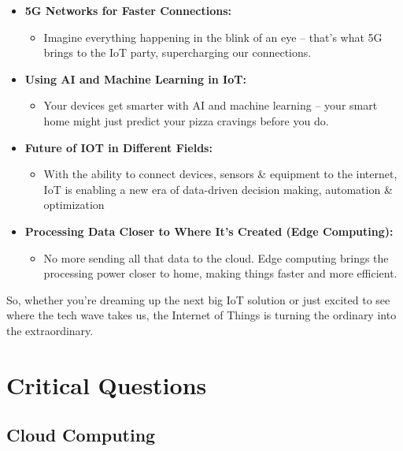 \documentclass[
  letterpaper,
  DIV=11,
  numbers=noendperiod]{scrreprt}
\providecommand{\tightlist}{%
  \setlength{\itemsep}{0pt}\setlength{\parskip}{0pt}}\usepackage{longtable,booktabs,array}
\begin{document}
\begin{itemize}
\item
  \textbf{5G Networks for Faster Connections:}

  \begin{itemize}
  \tightlist
  \item
    Imagine everything happening in the blink of an eye -- that's what
    5G brings to the IoT party, supercharging our connections.
  \end{itemize}
\item
  \textbf{Using AI and Machine Learning in IoT:}

  \begin{itemize}
  \tightlist
  \item
    Your devices get smarter with AI and machine learning -- your smart
    home might just predict your pizza cravings before you do.
  \end{itemize}
\item
  \textbf{Future of IOT in Different Fields:}

  \begin{itemize}
  \tightlist
  \item
    With the ability to connect devices, sensors \& equipment to the
    internet, IoT is enabling a new era of data-driven decision making,
    automation \& optimization
  \end{itemize}
\item
  \textbf{Processing Data Closer to Where It's Created (Edge
  Computing):}

  \begin{itemize}
  \tightlist
  \item
    No more sending all that data to the cloud. Edge computing brings
    the processing power closer to home, making things faster and more
    efficient.
  \end{itemize}
\end{itemize}

So, whether you're dreaming up the next big IoT solution or just excited
to see where the tech wave takes us, the Internet of Things is turning
the ordinary into the extraordinary.

\section{Critical Questions}\label{critical-questions}

\subsection{Cloud Computing}\label{cloud-computing-1}
\end{document}
